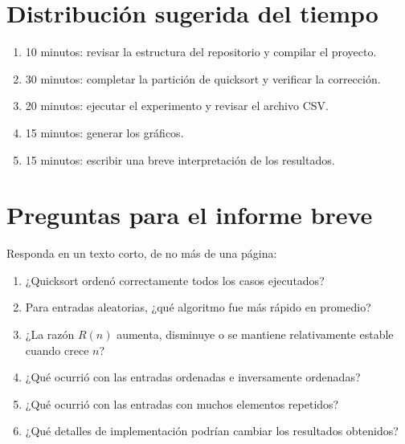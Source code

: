 \documentclass[11pt,a4paper]{article}
\begin{document}
\section{Distribución sugerida del tiempo}

\begin{enumerate}[label=\arabic*.]
  \item 10 minutos: revisar la estructura del repositorio y compilar el proyecto.
  \item 30 minutos: completar la partición de quicksort y verificar la corrección.
  \item 20 minutos: ejecutar el experimento y revisar el archivo CSV.
  \item 15 minutos: generar los gráficos.
  \item 15 minutos: escribir una breve interpretación de los resultados.
\end{enumerate}

\section{Preguntas para el informe breve}

Responda en un texto corto, de no más de una página:

\begin{enumerate}[label=\arabic*.]
  \item ¿Quicksort ordenó correctamente todos los casos ejecutados?
  \item Para entradas aleatorias, ¿qué algoritmo fue más rápido en promedio?
  \item ¿La razón $R(n)$ aumenta, disminuye o se mantiene relativamente estable cuando crece $n$?
  \item ¿Qué ocurrió con las entradas ordenadas e inversamente ordenadas?
  \item ¿Qué ocurrió con las entradas con muchos elementos repetidos?
  \item ¿Qué detalles de implementación podrían cambiar los resultados obtenidos?
\end{enumerate}
\end{document}
